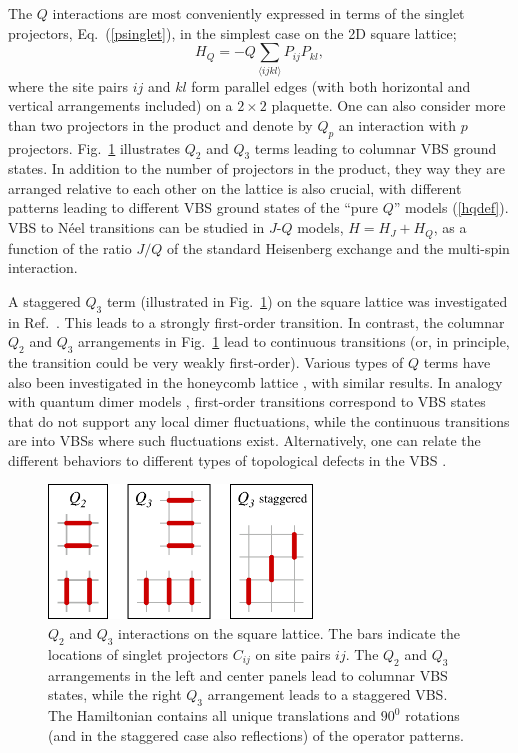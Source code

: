 \documentclass[10pt,pre,aps,twocolumn,showpacs,superscriptaddress,floatfix]{revtex4-1}
\begin{document}
The $Q$ interactions are most conveniently expressed in terms of the singlet projectors, Eq.~(\ref{psinglet}), in the simplest case on the 2D square lattice;
\begin{equation}
H_Q = - Q\sum_{\langle ijkl\rangle } P_{ij}P_{kl},
\label{hqdef}
\end{equation}
where the site pairs $ij$ and $kl$ form parallel edges (with both horizontal and vertical arrangements included) on a $2\times 2$ plaquette. 
One can also consider more than two projectors in the product and denote by $Q_p$ an interaction with $p$ projectors. Fig.~\ref{qterms} illustrates $Q_2$ 
and $Q_3$ terms leading to columnar VBS ground states. In addition to the number of projectors in the product, they way they are arranged relative to each 
other on the lattice is also crucial, with different patterns leading to different VBS ground states of the ``pure $Q$'' models (\ref{hqdef}). VBS to N\'eel 
transitions can be studied in $J$-$Q$ models, $H=H_J+H_Q$, as a function of the ratio $J/Q$ of the standard Heisenberg exchange and the multi-spin 
interaction.

A staggered $Q_3$ term (illustrated in Fig.~\ref{qterms})
on the square lattice was investigated in Ref.~\cite{Sen10}. This leads to a strongly first-order transition. In contrast, 
the columnar $Q_2$ and $Q_3$ arrangements in Fig.~\ref{qterms} lead to continuous transitions (or, in principle, the transition could be very weakly first-order). 
Various types of $Q$ terms have also been investigated in the honeycomb lattice \cite{Banerjee11}, with similar results. In analogy with quantum 
dimer models \cite{Rokhsar88,Moessner01}, first-order transitions correspond to VBS states that do not support any local dimer fluctuations, while 
the continuous transitions are into VBSs where such fluctuations exist. Alternatively, one can relate the different behaviors to different types of 
topological defects in the VBS \cite{levin2004:vbs,Banerjee11}.

\begin{figure}
\includegraphics[width=7cm, clip]{fig03.eps}
\caption{$Q_2$ and $Q_3$ interactions on the square lattice. The bars indicate the locations of singlet projectors 
$C_{ij}$ on site pairs $ij$. The $Q_2$ and $Q_3$ arrangements in the left and center panels lead to columnar VBS states,
while the right $Q_3$ arrangement leads to a staggered VBS. The Hamiltonian contains all unique translations and
$90^0$ rotations (and in the staggered case also reflections) of the operator patterns.}
\label{qterms}
\end{figure}
\end{document}
